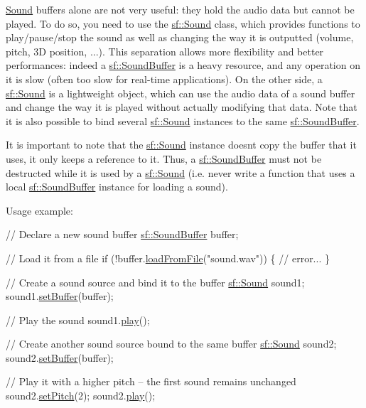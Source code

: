 \hyperlink{classsf_1_1_sound}{Sound} buffers alone are not very useful\+: they hold the audio data but cannot be played. To do so, you need to use the \hyperlink{classsf_1_1_sound}{sf\+::\+Sound} class, which provides functions to play/pause/stop the sound as well as changing the way it is outputted (volume, pitch, 3D position, ...). This separation allows more flexibility and better performances\+: indeed a \hyperlink{classsf_1_1_sound_buffer}{sf\+::\+Sound\+Buffer} is a heavy resource, and any operation on it is slow (often too slow for real-\/time applications). On the other side, a \hyperlink{classsf_1_1_sound}{sf\+::\+Sound} is a lightweight object, which can use the audio data of a sound buffer and change the way it is played without actually modifying that data. Note that it is also possible to bind several \hyperlink{classsf_1_1_sound}{sf\+::\+Sound} instances to the same \hyperlink{classsf_1_1_sound_buffer}{sf\+::\+Sound\+Buffer}.

It is important to note that the \hyperlink{classsf_1_1_sound}{sf\+::\+Sound} instance doesn\textquotesingle{}t copy the buffer that it uses, it only keeps a reference to it. Thus, a \hyperlink{classsf_1_1_sound_buffer}{sf\+::\+Sound\+Buffer} must not be destructed while it is used by a \hyperlink{classsf_1_1_sound}{sf\+::\+Sound} (i.\+e. never write a function that uses a local \hyperlink{classsf_1_1_sound_buffer}{sf\+::\+Sound\+Buffer} instance for loading a sound).

Usage example\+: 
\begin{DoxyCode}
\textcolor{comment}{// Declare a new sound buffer}
\hyperlink{classsf_1_1_sound_buffer}{sf::SoundBuffer} buffer;

\textcolor{comment}{// Load it from a file}
\textcolor{keywordflow}{if} (!buffer.\hyperlink{classsf_1_1_sound_buffer_a2be6a8025c97eb622a7dff6cf2594394}{loadFromFile}(\textcolor{stringliteral}{"sound.wav"}))
\{
    \textcolor{comment}{// error...}
\}

\textcolor{comment}{// Create a sound source and bind it to the buffer}
\hyperlink{classsf_1_1_sound}{sf::Sound} sound1;
sound1.\hyperlink{classsf_1_1_sound_a8b395e9713d0efa48a18628c8ec1972e}{setBuffer}(buffer);

\textcolor{comment}{// Play the sound}
sound1.\hyperlink{classsf_1_1_sound_a2953ffe632536e72e696fd880ced2532}{play}();

\textcolor{comment}{// Create another sound source bound to the same buffer}
\hyperlink{classsf_1_1_sound}{sf::Sound} sound2;
sound2.\hyperlink{classsf_1_1_sound_a8b395e9713d0efa48a18628c8ec1972e}{setBuffer}(buffer);

\textcolor{comment}{// Play it with a higher pitch -- the first sound remains unchanged}
sound2.\hyperlink{classsf_1_1_sound_source_a72a13695ed48b7f7b55e7cd4431f4bb6}{setPitch}(2);
sound2.\hyperlink{classsf_1_1_sound_a2953ffe632536e72e696fd880ced2532}{play}();
\end{DoxyCode}


